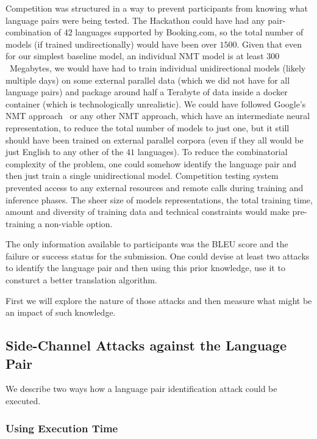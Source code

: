 \documentclass[]{article}
\begin{document}
Competition was structured in a way to prevent participants from knowing what language pairs were being tested.
The Hackathon could have had any pair-combination of $42$ languages supported by {{Booking.com}}, so the total number of models (if trained undirectionally) would have been over $1500$.
Given that even for our simplest baseline model, an individual NMT model is at least $300$~Megabytes, we would have had to train individual unidirectional models (likely multiple days) on some external parallel data (which we did not have for all language pairs) and package around half a Terabyte of data inside a docker container (which is technologically unrealistic).
We could have followed Google's NMT approach~\citep{johnson2016google} or any other NMT approach, which have an intermediate neural representation, to reduce the total number of models to just one, but it still should have been trained on external parallel corpora (even if they all would be just English to any other of the $41$ languages).
To reduce the combinatorial complexity of the problem, one could somehow identify the language pair and then just train a single unidirectional model.
Competition testing system prevented access to any external resources and remote calls during training and inference phases.
The sheer size of models representations, the total training time, amount and diversity of training data and technical constraints would make pre-training a non-viable option.

The only information available to participants was the BLEU score and the failure or success status for the submission.
One could devise at least two attacks to identify the language pair and then using this prior knowledge, use it to consturct a better translation algorithm.

First we will explore the nature of those attacks and then measure what might be an impact of such knowledge.

\subsection{Side-Channel Attacks against the Language Pair}
\label{sect:attack}

We describe two ways how a language pair identification attack could be executed.

\subsubsection{Using Execution Time}
\end{document}
